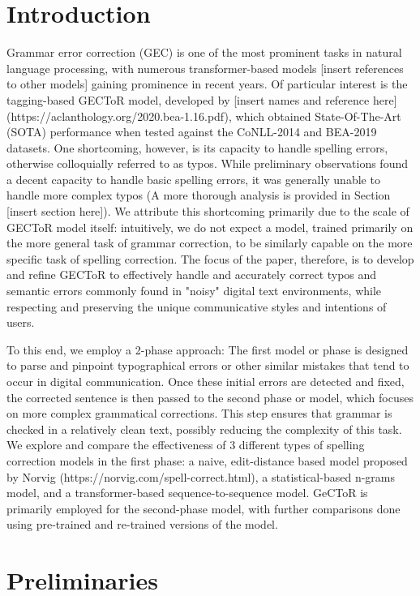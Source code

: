 \documentclass[sigconf, nonacm]{acmart}
\begin{document}
\section{Introduction}

Grammar error correction (GEC) is one of the most prominent tasks in natural language processing, with numerous transformer-based models [insert references to other models] gaining prominence in recent years. Of particular interest is the tagging-based GECToR model, developed by [insert names and reference here] (https://aclanthology.org/2020.bea-1.16.pdf), which obtained State-Of-The-Art (SOTA) performance when tested against the CoNLL-2014 and BEA-2019 datasets. One shortcoming, however, is its capacity to handle spelling errors, otherwise colloquially referred to as typos. While preliminary observations found a decent capacity to handle basic spelling errors, it was generally unable to handle more complex typos (A more thorough analysis is provided in Section [insert section here]). We attribute this shortcoming primarily due to the scale of GECToR model itself: intuitively, we do not expect a model, trained primarily on the more general task of grammar correction, to be similarly capable on the more specific task of spelling correction. The focus of the paper, therefore, is to develop and refine GECToR to effectively handle and accurately correct typos and semantic errors commonly found in "noisy" digital text environments, while respecting and preserving the unique communicative styles and intentions of users. 

To this end, we employ a 2-phase approach: The first model or phase is designed to parse and pinpoint typographical errors or other similar mistakes that tend to occur in digital communication. Once these initial errors are detected and fixed, the corrected sentence is then passed to the second phase or model, which focuses on more complex grammatical corrections. This step ensures that grammar is checked in a relatively clean text, possibly reducing the complexity of this task. We explore and compare the effectiveness of 3 different types of spelling correction models in the first phase: a naive, edit-distance based model proposed by Norvig (https://norvig.com/spell-correct.html), a statistical-based n-grams model, and a transformer-based sequence-to-sequence model. GeCToR is primarily employed for the second-phase model, with further comparisons done using pre-trained and re-trained versions of the model. 

\section{Preliminaries}
\end{document}
